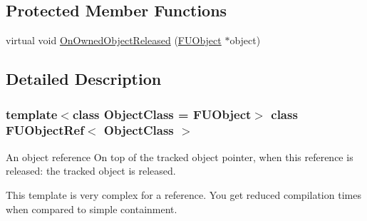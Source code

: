 \subsection*{Protected Member Functions}
\begin{DoxyCompactItemize}
\item 
virtual void \hyperlink{classFUObjectRef_a308359b2fff44b9b63fbc7c8516a1fef}{OnOwnedObjectReleased} (\hyperlink{classFUObject}{FUObject} $\ast$object)
\end{DoxyCompactItemize}


\subsection{Detailed Description}
\subsubsection*{template$<$class ObjectClass = FUObject$>$ class FUObjectRef$<$ ObjectClass $>$}

An object reference On top of the tracked object pointer, when this reference is released: the tracked object is released.

This template is very complex for a reference. You get reduced compilation times when compared to simple containment. 

